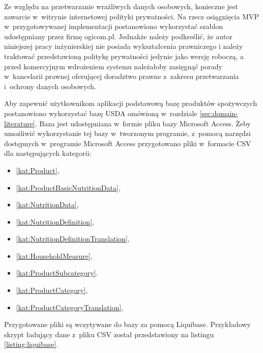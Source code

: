 \par
Ze względu na przetwarzanie wrażliwych danych osobowych, konieczne jest zawarcie w~witrynie internetowej polityki prywatności.
Na rzecz osiągnięcia MVP w~przygotowywanej implementacji postanowiono wykorzystać szablon udostępniany przez firmę ogicom.pl\cite{url:ogicom-privacy-policy}.
Jednakże należy podkreślić, że autor niniejszej pracy inżynierskiej nie posiada wykształcenia prawniczego
i należy traktować przedstawioną politykę prywatności jedynie jako wersję roboczą,
a przed komercyjnym wdrożeniem systemu należałoby zasięgnąć porady w~kancelarii prawnej oferującej doradztwo prawne z~zakresu przetwarzania i~ochrony danych osobowych.

\par
Aby zapewnić użytkownikom aplikacji podstawową bazę produktów spożywczych postanowiono wykorzystać bazę USDA omówioną w~rozdziale \ref{sec:domain-literature}.
Baza jest udostępniana w~formie pliku bazy Microsoft Access.
Żeby umożliwić wykorzystanie tej bazy w~tworzonym programie, z~pomocą narzędzi dostępnych w~programie Microsoft Access przygotowano pliki w~formacie CSV dla następujących kategorii:
\begin{itemize}
    \item\ref{kat:Product},
    \item\ref{kat:ProductBasicNutritionData},
    \item\ref{kat:NutritionData},
    \item\ref{kat:NutritionDefinition},
    \item\ref{kat:NutritionDefinitionTranslation},
    \item\ref{kat:HouseholdMeasure},
    \item\ref{kat:ProductSubcategory}.
    \item\ref{kat:ProductCategory},
    \item\ref{kat:ProductCategoryTranslation},
\end{itemize}

\par
Przygotowane pliki są wczytywane do bazy za pomocą Liquibase.
Przykładowy skrypt ładujący dane z~pliku CSV został przedstawiony na listingu \ref{listing:liquibase}.


